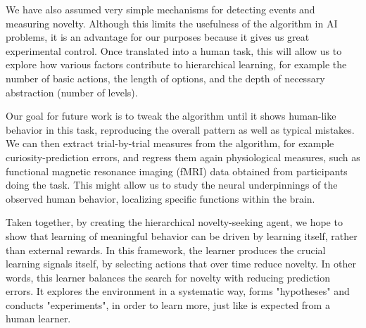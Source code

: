 \documentclass{article}
\begin{document}
We have also assumed very simple mechanisms for detecting events and measuring novelty. Although this limits the usefulness of the algorithm in AI problems, it is an advantage for our purposes because it gives us great experimental control. Once translated into a human task, this will allow us to explore how various factors contribute to hierarchical learning, for example the number of basic actions, the length of options, and the depth of necessary abstraction (number of levels). 

Our goal for future work is to tweak the algorithm until it shows human-like behavior in this task, reproducing the overall pattern as well as typical mistakes. We can then extract trial-by-trial measures from the algorithm, for example curiosity-prediction errors, and regress them again physiological measures, such as functional magnetic resonance imaging (fMRI) data obtained from participants doing the task. This might allow us to study the neural underpinnings of the observed human behavior, localizing specific functions within the brain.

Taken together, by creating the hierarchical novelty-seeking agent, we hope to show that learning of meaningful behavior can be driven by learning itself, rather than external rewards. In this framework, the learner produces the crucial learning signals itself, by selecting actions that over time reduce novelty. In other words, this learner balances the search for novelty with reducing prediction errors. It explores the environment in a systematic way, forms "hypotheses" and conducts "experiments", in order to learn more, just like is expected from a human learner.

\printbibliography
\end{document}
